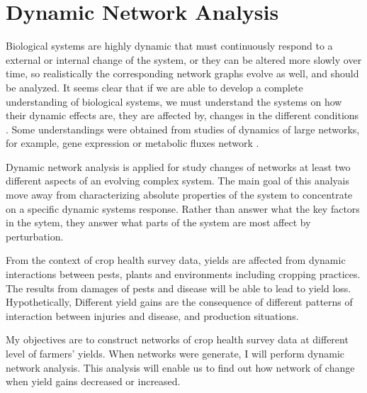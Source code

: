
\section*{Dynamic Network Analysis} %

Biological systems are highly dynamic that must continuously respond to a external or internal change of the system, or they can be altered more slowly over time, so realistically the corresponding network graphs evolve as well, and should be analyzed. It seems clear that if we are able to develop a complete understanding of biological systems, we must understand the systems on how their dynamic effects are, they are affected by, changes in the different conditions . Some understandings were obtained from studies of dynamics of large networks, for example, gene expression or metabolic fluxes network .

Dynamic network analysis is applied for study changes of networks at least two different aspects of an evolving complex system. The main goal of this analyais move away from characterizing absolute properties of the system to concentrate on a specific dynamic systems response. Rather than answer what the key factors in the sytem, they answer what parts of the system are most affect by perturbation.

From the context of crop health survey data, yields are affected from dynamic interactions between pests, plants and environments including cropping practices. The results from damages of pests and disease will be able to lead to yield loss. Hypothetically, Different yield gains are the consequence of different patterns of interaction between injuries and disease, and production situations.

My objectives are to construct networks of crop health survey data at different level of farmers' yields. When networks were generate, I will perform dynamic network analysis. This analysis will enable us to find out how network of change when yield gains decreased or increased.


